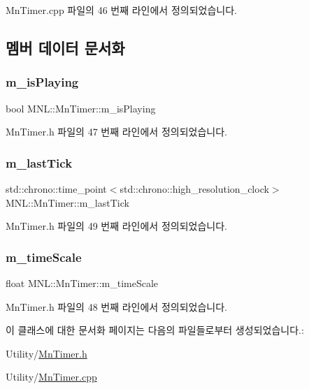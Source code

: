 Mn\+Timer.\+cpp 파일의 46 번째 라인에서 정의되었습니다.



\subsection{멤버 데이터 문서화}
\mbox{\label{class_m_n_l_1_1_mn_timer_a297ca44e41691a6fa7b83d8d98e6b463}} 
\subsubsection{\texorpdfstring{m\+\_\+is\+Playing}{m\_isPlaying}}
{\footnotesize\ttfamily bool M\+N\+L\+::\+Mn\+Timer\+::m\+\_\+is\+Playing\hspace{0.3cm}{\ttfamily [private]}}



Mn\+Timer.\+h 파일의 47 번째 라인에서 정의되었습니다.

\mbox{\label{class_m_n_l_1_1_mn_timer_a7158458bc690aec6a795242f6251ad40}} 
\subsubsection{\texorpdfstring{m\+\_\+last\+Tick}{m\_lastTick}}
{\footnotesize\ttfamily std\+::chrono\+::time\+\_\+point$<$std\+::chrono\+::high\+\_\+resolution\+\_\+clock$>$ M\+N\+L\+::\+Mn\+Timer\+::m\+\_\+last\+Tick\hspace{0.3cm}{\ttfamily [private]}}



Mn\+Timer.\+h 파일의 49 번째 라인에서 정의되었습니다.

\mbox{\label{class_m_n_l_1_1_mn_timer_aaaa9922dcae0495a530c73683d8b7adf}} 
\subsubsection{\texorpdfstring{m\+\_\+time\+Scale}{m\_timeScale}}
{\footnotesize\ttfamily float M\+N\+L\+::\+Mn\+Timer\+::m\+\_\+time\+Scale\hspace{0.3cm}{\ttfamily [private]}}



Mn\+Timer.\+h 파일의 48 번째 라인에서 정의되었습니다.



이 클래스에 대한 문서화 페이지는 다음의 파일들로부터 생성되었습니다.\+:\begin{DoxyCompactItemize}
\item 
Utility/\hyperlink{_mn_timer_8h}{Mn\+Timer.\+h}\item 
Utility/\hyperlink{_mn_timer_8cpp}{Mn\+Timer.\+cpp}\end{DoxyCompactItemize}
